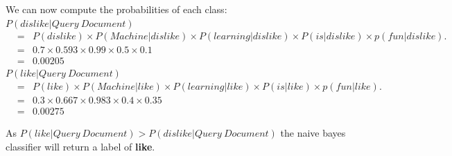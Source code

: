 \documentclass[--SOLUTION-OPTION--]{ditpaper}
\begin{document}
\begin{answer}
We can now compute the probabilities of each class:\\

$P(dislike|Query~Document)$
			\begin{eqnarray*}
&=& P(dislike) \times P(Machine|dislike) \times P(learning|dislike) \times P(is|dislike) \times p(fun|dislike).\\
&=& 0.7 \times 0.593 \times 0.99 \times 0.5 \times 0.1\\
&=& 0.00205
			\end{eqnarray*}
$P(like|Query~Document)$
			\begin{eqnarray*}
&=& P(like) \times P(Machine|like) \times P(learning|like) \times P(is|like) \times p(fun|like).\\
&=& 0.3 \times 0.667 \times 0.983 \times 0.4 \times 0.35\\
&=& 0.00275
			\end{eqnarray*}
			
As $P(like|Query~Document) > P(dislike|Query~Document)$ the naive bayes classifier will return a label of \textbf{like}.
		\end{answer}
%
\newpage

\end{document}
